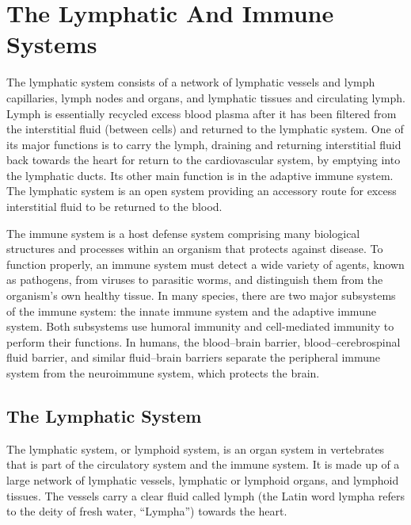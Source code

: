 \hypertarget{the-lymphatic-and-immune-systems}{%
\chapter{The Lymphatic And Immune Systems}\label{the-lymphatic-and-immune-systems}}

The lymphatic system consists of a network of lymphatic vessels and lymph capillaries, lymph nodes and organs, and lymphatic tissues and circulating lymph. Lymph is essentially recycled excess blood plasma after it has been filtered from the interstitial fluid (between cells) and returned to the lymphatic system. One of its major functions is to carry the lymph, draining and returning interstitial fluid back towards the heart for return to the cardiovascular system, by emptying into the lymphatic ducts. Its other main function is in the adaptive immune system. The lymphatic system is an open system providing an accessory route for excess interstitial fluid to be returned to the blood.

The immune system is a host defense system comprising many biological structures and processes within an organism that protects against disease. To function properly, an immune system must detect a wide variety of agents, known as pathogens, from viruses to parasitic worms, and distinguish them from the organism's own healthy tissue. In many species, there are two major subsystems of the immune system: the innate immune system and the adaptive immune system. Both subsystems use humoral immunity and cell-mediated immunity to perform their functions. In humans, the blood--brain barrier, blood--cerebrospinal fluid barrier, and similar fluid--brain barriers separate the peripheral immune system from the neuroimmune system, which protects the brain.

\hypertarget{the-lymphatic-system}{%
\section{The Lymphatic System}\label{the-lymphatic-system}}

The lymphatic system, or lymphoid system, is an organ system in vertebrates that is part of the circulatory system and the immune system. It is made up of a large network of lymphatic vessels, lymphatic or lymphoid organs, and lymphoid tissues. The vessels carry a clear fluid called lymph (the Latin word lympha refers to the deity of fresh water, ``Lympha'') towards the heart.



